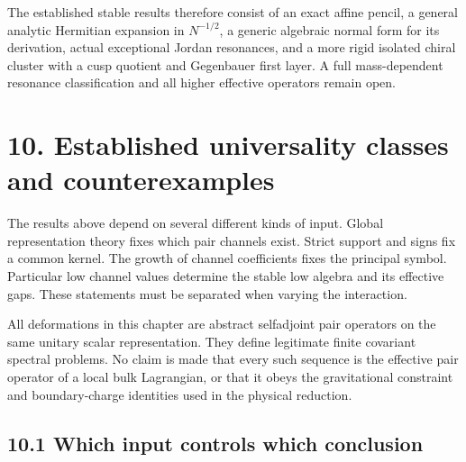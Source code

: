 \documentclass[a4paper,11pt]{article}
\numberwithin{equation}{section}
\begin{document}
The established stable results therefore consist of an exact affine pencil, a general analytic Hermitian expansion in \(N^{-1/2}\), a generic algebraic normal form for its derivation, actual exceptional Jordan resonances, and a more rigid isolated chiral cluster with a cusp quotient and Gegenbauer first layer. A full mass-dependent resonance classification and all higher effective operators remain open.

\clearpage
\hypertarget{established-universality-classes-and-counterexamples}{%
\section{10. Established universality classes and counterexamples}\label{established-universality-classes-and-counterexamples}}

The results above depend on several different kinds of input. Global representation theory fixes which pair channels exist. Strict support and signs fix a common kernel. The growth of channel coefficients fixes the principal symbol. Particular low channel values determine the stable low algebra and its effective gaps. These statements must be separated when varying the interaction.

All deformations in this chapter are abstract selfadjoint pair operators on the same unitary scalar representation. They define legitimate finite covariant spectral problems. No claim is made that every such sequence is the effective pair operator of a local bulk Lagrangian, or that it obeys the gravitational constraint and boundary-charge identities used in the physical reduction.

\hypertarget{which-input-controls-which-conclusion}{%
\subsection{10.1 Which input controls which conclusion}\label{which-input-controls-which-conclusion}}
\end{document}

